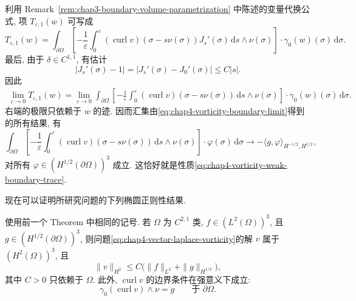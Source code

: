 \begin{Proof}
\begin{itemize}
利用 Remark~\ref{rem:chap3-boundary-volume-parametrization} 中陈述的变量代换公式, 项 $T_{\varepsilon,1}(w)$ 可写成
\[
 T_{\varepsilon,1}(w)
 =\int_{\partial\Omega}\left[-\frac1\varepsilon\int_0^\varepsilon
 (\operatorname{curl}v)(\sigma-s\nu(\sigma))J_s'(\sigma)\,\mathrm ds
 \wedge\nu(\sigma)\right]\cdot\gamma_0(w)(\sigma)\,\mathrm d\sigma.
\]
最后, 由于 $\delta\in C^{1,1}$, 有估计
\[
 |J_s'(\sigma)-1|=|J_s'(\sigma)-J_0'(\sigma)|\leq C|s|.
\]
因此
\begin{align*}
 \lim_{\varepsilon\to0}T_{\varepsilon,1}(w)
 =\lim_{\varepsilon\to0}\int_{\partial\Omega}
 \left[-\frac1\varepsilon\int_0^\varepsilon
 (\operatorname{curl}v)(\sigma-s\nu(\sigma))\,\mathrm ds\wedge\nu(\sigma)\right]
 \cdot\gamma_0(w)(\sigma)\,\mathrm d\sigma.
\end{align*}
右端的极限只依赖于 $w$ 的迹. 因而汇集由\eqref{eq:chap4-vorticity-boundary-limit}得到的所有结果, 有
\[
 \int_{\partial\Omega}\left[-\frac1\varepsilon\int_0^\varepsilon
 (\operatorname{curl}v)(\sigma-s\nu(\sigma))\,\mathrm ds\wedge\nu(\sigma)\right]
 \cdot\varphi(\sigma)\,\mathrm d\sigma
 \longrightarrow-\langle g,\varphi\rangle_{H^{-1/2},H^{1/2}},
\]
对所有 $\varphi\in(H^{1/2}(\partial\Omega))^3$ 成立. 这恰好就是性质\eqref{eq:chap4-vorticity-weak-boundary-trace}.
\end{itemize}
\end{Proof}
现在可以证明所研究问题的下列椭圆正则性结果.

\begin{Theorem}
\label{thm:chap4-vector-laplace-vorticity-regularity}
使用前一个 Theorem 中相同的记号. 若 $\Omega$ 为 $C^{2,1}$ 类, $f\in(L^2(\Omega))^3$, 且 $g\in(H^{1/2}(\partial\Omega))^3$, 则问题\eqref{eq:chap4-vector-laplace-vorticity}的解 $v$ 属于 $(H^2(\Omega))^3$, 且
\[
 \|v\|_{H^2}\leq C\bigl(\|f\|_{L^2}+\|g\|_{H^{1/2}}\bigr),
\]
其中 $C>0$ 只依赖于 $\Omega$. 此外, $\operatorname{curl}v$ 的边界条件在强意义下成立:
\[
 \gamma_0(\operatorname{curl}v)\wedge\nu=g
 \qquad\text{于 }\partial\Omega.
\]
\end{Theorem}

